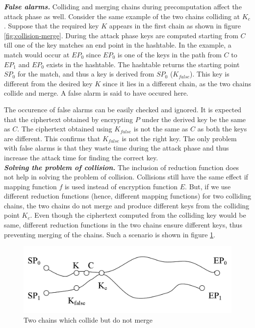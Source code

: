\noindent \textit{\textbf{False alarms.}} Colliding and merging chains during precomputation affect the attack phase as well. Consider the same example of the two chains colliding at $K_c$. Suppose that the required key $K$ appears in the first chain as shown in figure \ref{fig:collision-merge}. During the attack phase keys are computed starting from $C$ till one of the key matches an end point in the hashtable. 
In the example, a match would occur at $EP_0$ since $EP_0$ is one of the keys in the path from $C$ to $EP_1$ and $EP_0$ exists in the hashtable. The hashtable returns the starting point $SP_0$ for the match, and thus a key is derived from $SP_0$ ($K_{false}$). This key is different from the desired key $K$ since it lies in a different chain, as the two chains collide and merge. A false alarm is said to have occured here.

The occurence of false alarms can be easily checked and ignored. It is expected that the ciphertext obtained by encrypting $P$ under the derived key be the same as $C$. The ciphertext obtained using $K_{false}$ is not the same as $C$ as both the keys are different. This confirms that $K_{false}$ is not the right key. The only problem with false alarms is that they waste time during the attack phase and thus increase the attack time for finding the correct key.\\

\noindent \textit{\textbf{Solving the problem of collision.}} The inclusion of reduction function does not help in solving the problem of collision. Collisions still have the same effect if mapping function $f$ is used instead of encryption function $E$. But, if we use different reduction functions (hence, different mapping functions) for two colliding chains, the two chains do not merge and produce different keys from the colliding point $K_c$. Even though the ciphertext computed from the colliding key would be same, different reduction functions in the two chains ensure different keys, thus preventing merging of the chains. Such a scenario is shown in figure \ref{fig:collision-not-merge}. 

\begin{figure}[ht!]
	\centering
		\includegraphics[width=4.5in]{./figures/collision-not-merge.PNG}
	\caption{Two chains which collide but do not merge}	
	\label{fig:collision-not-merge}
\end{figure}

